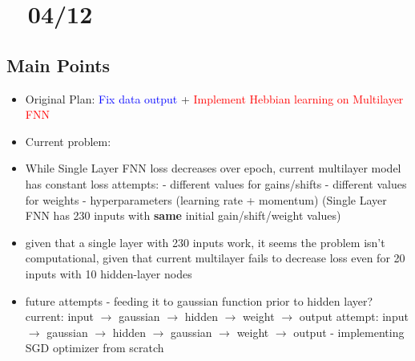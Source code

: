 \documentclass[12pt, a4paper]{article}
\begin{document}
\section*{~ 04/12}

\subsection*{Main Points}

\noindent
\begin{itemize}
    \item Original Plan: \textcolor{blue}{Fix data output} + \textcolor{red}{Implement Hebbian learning on Multilayer FNN}
    \item Current problem: \color{ForestGreen}{constant loss for Multilayer FNN}\color{black}
    \item While Single Layer FNN loss decreases over epoch, current multilayer model has constant loss
        \subitem attempts:
         - different values for gains/shifts
         - different values for weights
         - hyperparameters (learning rate + momentum)
        \subitem (Single Layer FNN has 230 inputs with \textbf{same} initial gain/shift/weight values)
    \item given that a single layer with 230 inputs work, it seems the problem isn't computational, given that current multilayer  fails to decrease loss even for 20 inputs with 10 hidden-layer nodes
    \item future attempts
         - feeding it to gaussian function prior to hidden layer?
            \subitem current: input $\rightarrow$ gaussian $\rightarrow$ hidden $\rightarrow$ weight $\rightarrow$ output
            \subitem attempt: input $\rightarrow$ gaussian $\rightarrow$ hidden \color{red} $\rightarrow$ gaussian \color{black} $\rightarrow$ weight $\rightarrow$ output
         - implementing SGD optimizer from scratch
        

\end{itemize}
\end{document}
